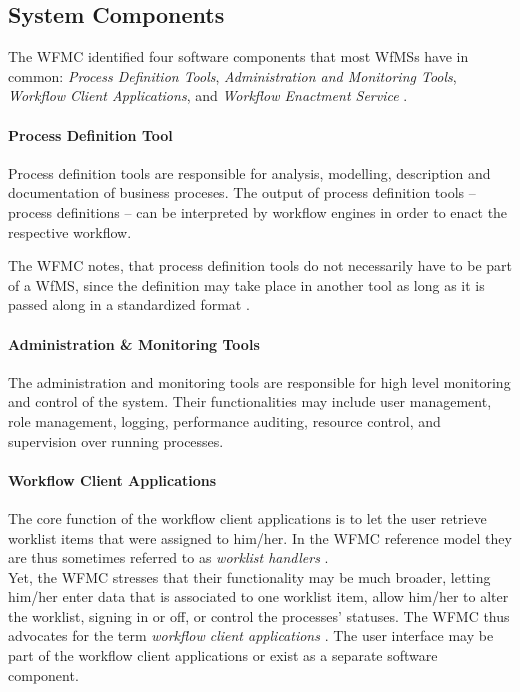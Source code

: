   \subsection{System Components} %
  \label{sub:system_components}
    The \ac{WFMC} identified four software components that most \acp{WfMS} have in common: \emph{Process Definition Tools}, \emph{Administration and Monitoring Tools}, \emph{Workflow Client Applications}, and \emph{Workflow Enactment Service} \cite{Hollingsworth1995Wfmc}.

    \paragraph{Process Definition Tool} %
    \label{par:process_definition_tool}
      Process definition tools are responsible for analysis, modelling, description and documentation of business proceses. The output of process definition tools -- process definitions -- can be interpreted by workflow engines in order to enact the respective workflow.

      The \ac{WFMC} notes, that process definition tools do not necessarily have to be part of a \ac{WfMS}, since the definition may take place in another tool as long as it is passed along in a standardized format \cite{Hollingsworth1995Wfmc}.

    \paragraph{Administration \& Monitoring Tools} %
    \label{par:administration_&_monitoring_tools}

      The administration and monitoring tools are responsible for high level monitoring and control of the system. Their functionalities may include user management, role management, logging, performance auditing, resource control, and supervision over running processes.

    \paragraph{Workflow Client Applications} %
    \label{par:workflow_client_applications}
      The core function of the workflow client applications is to let the user retrieve worklist items that were assigned to him/her. In the \ac{WFMC} reference model they are thus sometimes referred to as \emph{worklist handlers} \cite{Hollingsworth1995Wfmc}. \\
      Yet, the \ac{WFMC} stresses that their functionality may be much broader, \eg letting him/her enter data that is associated to one worklist item, allow him/her to alter the worklist, signing in or off, or control the processes' statuses. The \ac{WFMC} thus advocates for the term \emph{workflow client applications} \cite{Hollingsworth1995Wfmc}.
      The user interface may be part of the workflow client applications or exist as a separate software component.

